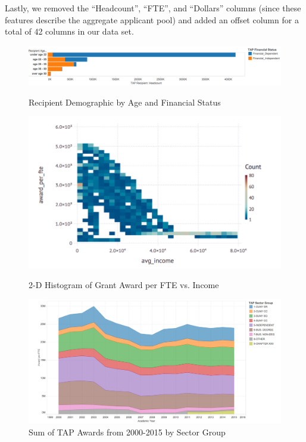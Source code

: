 \documentclass[12pt, fleqn]{article}
\begin{document}
Lastly, we removed the ``Headcount'', ``FTE'', and ``Dollars'' columns (since these features describe the aggregate applicant pool) and added an offset column for a total of 42 columns in our data set.

\begin{figure}
	\begin{center}
	\includegraphics[scale = 0.30]{financial_status.png}
	\caption{Recipient Demographic by Age and Financial Status}
	\end{center}
	\begin{minipage}[c]{0.4\linewidth}
		\includegraphics[width=\linewidth]{avgincome_vs_award.png}
		\caption{2-D Histogram of Grant Award per FTE vs. Income}
	\end{minipage}
	\hfill
	\begin{minipage}[c]{0.5\linewidth}
		\includegraphics[width=\linewidth]{sector_group.png}
		\vspace{-0.5cm}
		\caption{Sum of TAP Awards from 2000-2015 by Sector Group}
	\end{minipage}
\end{figure}
\end{document}
